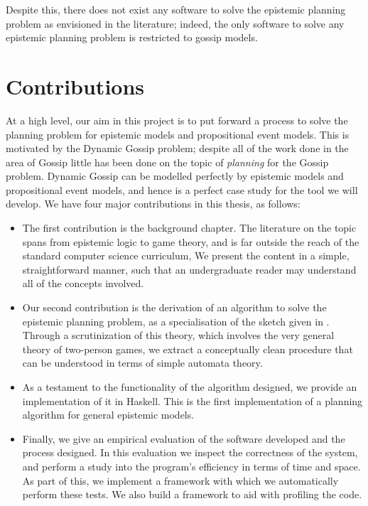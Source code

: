 \documentclass[ %
                    author={Leo Poulson},
                supervisor={Dr. Steven Ramsay},
                    degree={BSc},
                     title={Epistemic Planning for the Dynamic Gossip problem},
                  subtitle={},
                      year={2019} ]{dissertation}
\begin{document}
Despite this, there does not exist any software to solve the epistemic planning
problem as envisioned in the literature; indeed, the only software to solve any
epistemic planning problem is restricted to gossip models.

\section{Contributions}

At a high level, our aim in this project is to put forward a process to solve
the planning problem for epistemic models and propositional event models. This
is motivated by the Dynamic Gossip problem; despite all of the work done in the
area of Gossip little has been done on the topic of \emph{planning} for the
Gossip problem. Dynamic Gossip can be modelled perfectly by epistemic models and
propositional event models, and hence is a perfect case study for the tool we
will develop. We have four major contributions in this thesis, as follows:

\begin{itemize}
  \setlength\itemsep{1em}
\item The first contribution is the background chapter. The literature on the
  topic spans from epistemic logic to game theory, and is far outside the reach
  of the standard computer science curriculum, We present the content in a
  simple, straightforward manner, such that an undergraduate reader may
  understand all of the concepts involved.
\item Our second contribution is the derivation of an algorithm to solve the
  epistemic planning problem, as a specialisation of the sketch given in
  \cite{AutomataTechniques}. Through a scrutinization of this theory, which
  involves the very general theory of two-person games, we extract a
  conceptually clean procedure that can be understood in terms of simple
  automata theory.
\item As a testament to the functionality of the algorithm designed, we provide
  an implementation of it in Haskell. This is the first implementation of a
  planning algorithm for general epistemic models. 
\item Finally, we give an empirical evaluation of the software developed and the
  process designed. In this evaluation we inspect the correctness of the system,
  and perform a study into the program's efficiency in terms of time and space.
  As part of this, we implement a framework with which we automatically perform
  these tests. We also build a framework to aid with profiling the code.
\end{itemize}
\end{document}
